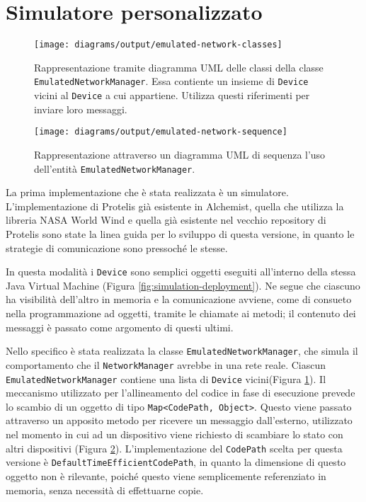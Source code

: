 \section{Simulatore personalizzato}
\begin{figure}
  \centering
  \texttt{[image: diagrams/output/emulated-network-classes]}
  \caption{Rappresentazione tramite diagramma UML delle classi della classe
    \texttt{EmulatedNetworkManager}. Essa contiente un insieme di
    \texttt{Device} vicini al \texttt{Device} a cui appartiene. Utilizza questi
    riferimenti per inviare loro messaggi.}
  \label{fig:emulated-network-classes}
\end{figure}
\begin{figure}
  \centering
  \texttt{[image: diagrams/output/emulated-network-sequence]}
  \caption{Rappresentazione attraverso un diagramma UML di sequenza l'uso
    dell'entità \texttt{EmulatedNetworkManager}.}
    \label{fig:emulated-network-sequence}
\end{figure}
La prima implementazione che è stata realizzata è un simulatore.
L'implementazione di Protelis già esistente in Alchemist, quella che utilizza
la libreria NASA World Wind e quella già esistente nel vecchio repository di
Protelis sono state la linea guida per lo sviluppo di questa versione, in
quanto le strategie di comunicazione sono pressoché le stesse.

In questa modalità i \texttt{Device} sono semplici oggetti eseguiti all'interno
della stessa Java Virtual Machine (Figura \ref{fig:simulation-deployment}). Ne
segue che ciascuno ha visibilità dell'altro in memoria e la comunicazione
avviene, come di consueto nella programmazione ad oggetti, tramite le chiamate
ai metodi; il contenuto dei messaggi è passato come argomento di questi ultimi.

Nello specifico è stata realizzata la classe \texttt{EmulatedNetworkManager},
che simula il comportamento che il \texttt{NetworkManager} avrebbe in una rete
reale. Ciascun \texttt{EmulatedNetworkManager} contiene una lista di
\texttt{Device} vicini(Figura \ref{fig:emulated-network-classes}). Il meccanismo
utilizzato per l'allineamento del codice in fase di esecuzione prevede lo
scambio di un oggetto di tipo \texttt{Map<CodePath, Object>}.
Questo viene passato attraverso un apposito metodo per ricevere un messaggio
dall'esterno, utilizzato nel momento in cui ad un dispositivo viene richiesto di
scambiare lo stato con altri dispositivi (Figura
\ref{fig:emulated-network-sequence}).
L'implementazione del \texttt{CodePath} scelta per questa versione è
\texttt{DefaultTimeEfficientCodePath}, in quanto la dimensione di questo oggetto
non è rilevante, poiché questo viene semplicemente referenziato in memoria,
senza necessità di effettuarne copie.

